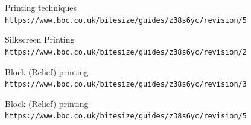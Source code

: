 \documentclass[a4paper,12pt]{article}
\begin{document}
\begin{thebibliography}{3}
Printing techniques
\\\texttt{https://www.bbc.co.uk/bitesize/guides/z38s6yc/revision/5}

Silkscreen Printing
\\\texttt{https://www.bbc.co.uk/bitesize/guides/z38s6yc/revision/2}

Block (Relief) printing
\\\texttt{https://www.bbc.co.uk/bitesize/guides/z38s6yc/revision/3}

Block (Relief) printing
\\\texttt{https://www.bbc.co.uk/bitesize/guides/z38s6yc/revision/5}

\end{thebibliography}
\end{document}
